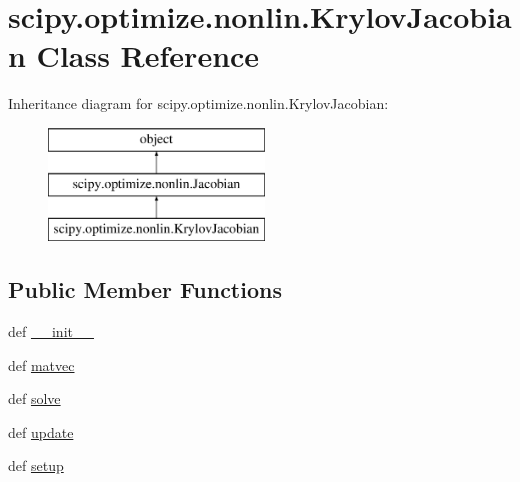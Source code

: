 \hypertarget{classscipy_1_1optimize_1_1nonlin_1_1KrylovJacobian}{}\section{scipy.\+optimize.\+nonlin.\+Krylov\+Jacobian Class Reference}
\label{classscipy_1_1optimize_1_1nonlin_1_1KrylovJacobian}
Inheritance diagram for scipy.\+optimize.\+nonlin.\+Krylov\+Jacobian\+:\begin{figure}[H]
\begin{center}
\leavevmode
\includegraphics[height=3.000000cm]{classscipy_1_1optimize_1_1nonlin_1_1KrylovJacobian}
\end{center}
\end{figure}
\subsection*{Public Member Functions}
\begin{DoxyCompactItemize}
\item 
def \hyperlink{classscipy_1_1optimize_1_1nonlin_1_1KrylovJacobian_a0a6c95117c1b082a29ce8c125796073b}{\+\_\+\+\_\+init\+\_\+\+\_\+}
\item 
def \hyperlink{classscipy_1_1optimize_1_1nonlin_1_1KrylovJacobian_aac251e5e851386219368a0c3fb6bf4d3}{matvec}
\item 
def \hyperlink{classscipy_1_1optimize_1_1nonlin_1_1KrylovJacobian_a6d69c44ca22f4a711c5d644edd0969ff}{solve}
\item 
def \hyperlink{classscipy_1_1optimize_1_1nonlin_1_1KrylovJacobian_a78738526e4c7063118c29b115ef2d119}{update}
\item 
def \hyperlink{classscipy_1_1optimize_1_1nonlin_1_1KrylovJacobian_ab107ef7d6846e5bfc967547692f10973}{setup}
\end{DoxyCompactItemize}
